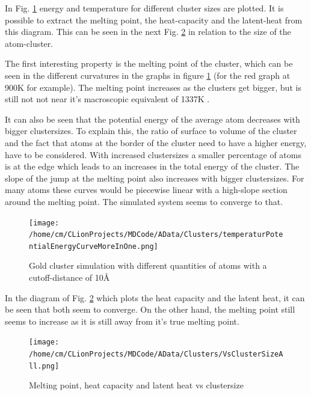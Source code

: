 \par 
In Fig.  \ref{GoldClusterSimulationTemperaturEnergy4In1} energy and temperature for different cluster sizes are plotted. It is possible to extract the melting point, the heat-capacity and the latent-heat from this diagram. This can be seen in the next Fig. \ref{GoldClusterSimulationVsClustersize} in relation to the size of the atom-cluster.
\par 
The first interesting property is the melting point of the cluster, which can be seen in the different curvatures in the graphs in figure \ref{GoldClusterSimulationTemperaturEnergy4In1} (for the red graph at 900K for example). The melting point increases as the clusters get bigger, but is still not not near it's macroscopic equivalent of 1337K \cite{Kurzweil2015}. 
\par
It can also be seen that the potential energy of the average atom decreases with bigger clustersizes. To explain this, the ratio of surface to volume of the cluster and the fact that atoms at the border of the cluster need to have a higher energy, have to be considered. With increased clustersizes a smaller percentage of atoms is at the edge which leads to an increases in the total energy of the cluster. 
The slope of the jump at the melting point also increases with bigger clustersizes. For many atoms these curves would be piecewise linear with a high-slope section around the melting point. The simulated system seems to converge to that. 

\begin{figure}
	\begin{center} 
		\texttt{[image: /home/cm/CLionProjects/MDCode/AData/Clusters/temperaturPotentialEnergyCurveMoreInOne.png]} 
	\end{center} 
	\caption[Gold cluster simulation]{Gold cluster simulation with different quantities of atoms with a cutoff-distance of 10\r{A}} 
	\label{GoldClusterSimulationTemperaturEnergy4In1} 
\end{figure} 

In the diagram of Fig. \ref{GoldClusterSimulationVsClustersize} which plots the heat capacity and the latent heat, it can be seen that both seem to converge. On the other hand, the melting point still seems to increase as it is still away from it's true melting point.

\begin{figure}
	\begin{center} 
		\texttt{[image: /home/cm/CLionProjects/MDCode/AData/Clusters/VsClusterSizeAll.png]} 
	\end{center} 
	\caption[Melting point, heat capacity and latent heat vs clustersize]{Melting point, heat capacity and latent heat vs clustersize} 
	\label{GoldClusterSimulationVsClustersize} 
\end{figure} 
